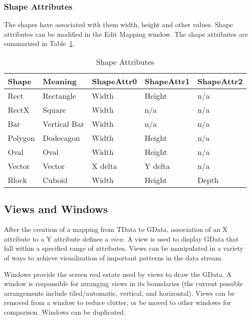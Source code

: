 \subsubsection{Shape Attributes}

The shapes have associated with them width, height and other values. Shape
attributes can be modified in the Edit Mapping window. The shape attributes
are summarized in Table~\ref{shapeattrs}.

\begin{table}[htbp]
\begin{center}
\caption{Shape Attributes\label{shapeattrs}}
\bigskip
\begin{tabular}{l|l|l|l|l}
Shape   & Meaning      & ShapeAttr0 & ShapeAttr1 & ShapeAttr2 \\
\hline
Rect    & Rectangle    & Width      & Height     & n/a \\
RectX   & Square       & Width      & n/a        & n/a \\
Bar     & Vertical Bar & Width      & n/a        & n/a \\
Polygon & Dodecagon    & Width      & Height     & n/a \\  
Oval    & Oval         & Width      & Height     & n/a \\
Vector  & Vector       & X delta    & Y delta    & n/a \\
Block   & Cuboid       & Width      & Height     & Depth
\end{tabular}
\end{center}
\end{table}


\subsection{Views and Windows}

After the creation of a mapping from TData to GData, association of an X
attribute to a Y attribute defines a {\em view}. A view is used to display GData
that fall within a specified range of attributes. Views can be manipulated in a
variety of ways to achieve visualization of important patterns in the data
stream.

Windows provide the screen real estate used by views to draw the GData. A window
is responsible for arranging views in its boundaries (the current possible
arrangements include tiled/automatic, vertical, and horizontal). Views can be
removed from a window to reduce clutter, or be moved to other windows for
comparison. Windows can be duplicated.

